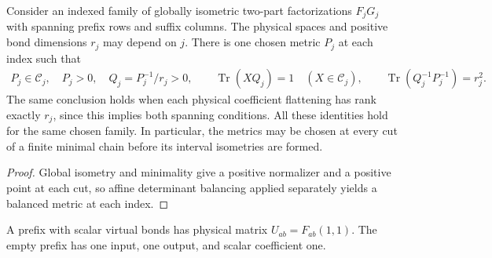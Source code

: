 \begin{lemma}
    \label{thm:mpu_simultaneous_balanced_cut_metrics}
    \leanok
    Consider an indexed family of globally isometric two-part
    factorizations $F_jG_j$ with spanning prefix rows and suffix
    columns. The physical spaces and positive bond dimensions $r_j$
    may depend on $j$. There is one chosen metric $P_j$ at each index
    such that
    \begin{align}
        P_j\in\mathcal C_j,\quad P_j>0,\quad Q_j=P_j^{-1}/r_j>0,
        \qquad \operatorname{Tr}(XQ_j)=1\quad(X\in\mathcal C_j),
        \qquad \operatorname{Tr}(Q_j^{-1}P_j^{-1})=r_j^2.
    \end{align}
    The same conclusion holds when each physical coefficient flattening
    has rank exactly $r_j$, since this implies both spanning conditions.
    All these identities hold for the same chosen family. In
    particular, the metrics may be chosen at every cut of a finite
    minimal chain before its interval isometries are formed.
\end{lemma}
\begin{proof}\leanok
    Global isometry and minimality give a positive normalizer and
    a positive point at each cut, so affine determinant balancing
    applied separately yields a balanced metric at each index.
\end{proof}

\begin{definition}
    \label{def:mpu_scalar_endpoint_caps}
    \leanok
    A prefix with scalar virtual bonds has physical matrix
    $U_{ab}=F_{ab}(1,1)$. The empty prefix has one input, one output,
    and scalar coefficient one.
\end{definition}

